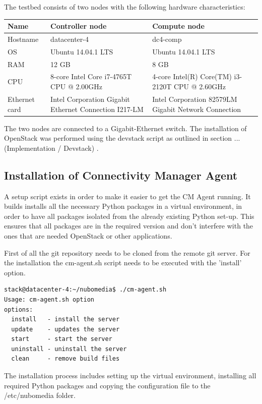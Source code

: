 The testbed consists of two nodes with the following hardware characteristics:

\begin{tabularx}{\textwidth}{ |X|X|X|X| }
\hline Name & \textbf{Controller node} & \textbf{Compute node} \\ 
\hline Hostname & datacenter-4 & dc4-comp \\ 
\hline OS & Ubuntu 14.04.1 LTS & Ubuntu 14.04.1 LTS \\ 
\hline RAM & 12 GB & 8 GB \\ 
\hline CPU & 8-core Intel Core i7-4765T CPU @ 2.00GHz & 4-core Intel(R) Core(TM) i3-2120T CPU @ 2.60GHz \\ 
\hline Ethernet card & Intel Corporation Gigabit Ethernet Connection I217-LM & Intel Corporation 82579LM Gigabit Network Connection \\ 
\hline 
\end{tabularx}

The two nodes are connected to a Gigabit-Ethernet switch. The installation of OpenStack was performed using the devstack script as outlined in section ... (Implementation / Devstack) .

\subsection{Installation of Connectivity Manager Agent}

A setup script exists in order to make it easier to get the CM Agent running. It builds installs all the necessary Python packages in a virtual environment, in order to have all packages isolated from the already existing Python set-up. This ensures that all packages are in the required version and don't interfere with the ones that are needed OpenStack or other applications. 

First of all the git repository needs to be cloned from the remote git server. For the installation the cm-agent.sh script needs to be executed with the 'install' option.
\begin{lstlisting}
stack@datacenter-4:~/nubomedia$ ./cm-agent.sh 
Usage: cm-agent.sh option
options:
  install   - install the server
  update    - updates the server
  start     - start the server
  uninstall - uninstall the server
  clean     - remove build files
\end{lstlisting}
The installation process includes setting up the virtual environment, installing all required Python packages and copying the configuration file to the /etc/nubomedia folder.

